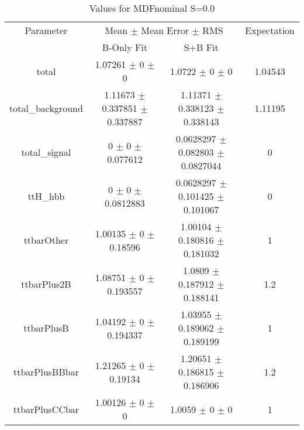 \begin{table}
\centering
\caption{Values for MDFnominal S=0.0}
\begin{tabular}{cccc}
\toprule
Parameter & \multicolumn{2}{c}{Mean $\pm$ Mean Error $\pm$ RMS} & Expectation\\
 & B-Only Fit & S+B Fit & \\
\midrule
total & \num{1.07261} $\pm$ \num{0} $\pm$ \num{0} & \num{1.0722} $\pm$ \num{0} $\pm$ \num{0} & \num{1.04543}\\
total\_background & \num{1.11673} $\pm$ \num{0.337851} $\pm$ \num{0.337887} & \num{1.11371} $\pm$ \num{0.338123} $\pm$ \num{0.338143} & \num{1.11195}\\
total\_signal & \num{0} $\pm$ \num{0} $\pm$ \num{0.077612} & \num{0.0628297} $\pm$ \num{0.082803} $\pm$ \num{0.0827044} & \num{0}\\
ttH\_hbb & \num{0} $\pm$ \num{0} $\pm$ \num{0.0812883} & \num{0.0628297} $\pm$ \num{0.101425} $\pm$ \num{0.101067} & \num{0}\\
ttbarOther & \num{1.00135} $\pm$ \num{0} $\pm$ \num{0.18596} & \num{1.00104} $\pm$ \num{0.180816} $\pm$ \num{0.181032} & \num{1}\\
ttbarPlus2B & \num{1.08751} $\pm$ \num{0} $\pm$ \num{0.193557} & \num{1.0809} $\pm$ \num{0.187912} $\pm$ \num{0.188141} & \num{1.2}\\
ttbarPlusB & \num{1.04192} $\pm$ \num{0} $\pm$ \num{0.194337} & \num{1.03955} $\pm$ \num{0.189062} $\pm$ \num{0.189199} & \num{1}\\
ttbarPlusBBbar & \num{1.21265} $\pm$ \num{0} $\pm$ \num{0.19134} & \num{1.20651} $\pm$ \num{0.186815} $\pm$ \num{0.186906} & \num{1.2}\\
ttbarPlusCCbar & \num{1.00126} $\pm$ \num{0} $\pm$ \num{0} & \num{1.0059} $\pm$ \num{0} $\pm$ \num{0} & \num{1}\\
\bottomrule
\end{tabular}
\end{table}